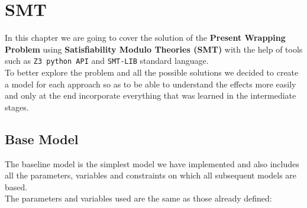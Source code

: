 \chapter{SMT}

In this chapter we are going to cover the solution of the \textbf{Present Wrapping Problem} using
\textbf{Satisfiability Modulo Theories (SMT)} with the help of tools such as \texttt{Z3 python API} \cite{z3}
and \texttt{SMT-LIB} \cite{smt2lib} standard language.\\
To better explore the problem and all the possible solutions we decided to create a model for
each approach so as to be able to understand the effects more easily and only at the end incorporate
everything that was learned in the intermediate stages.

\section{Base Model}

The baseline model is the simplest model we have implemented and also includes all the parameters,
variables and constraints on which all subsequent models are based.\\
The parameters and variables used are the same as those already defined:

